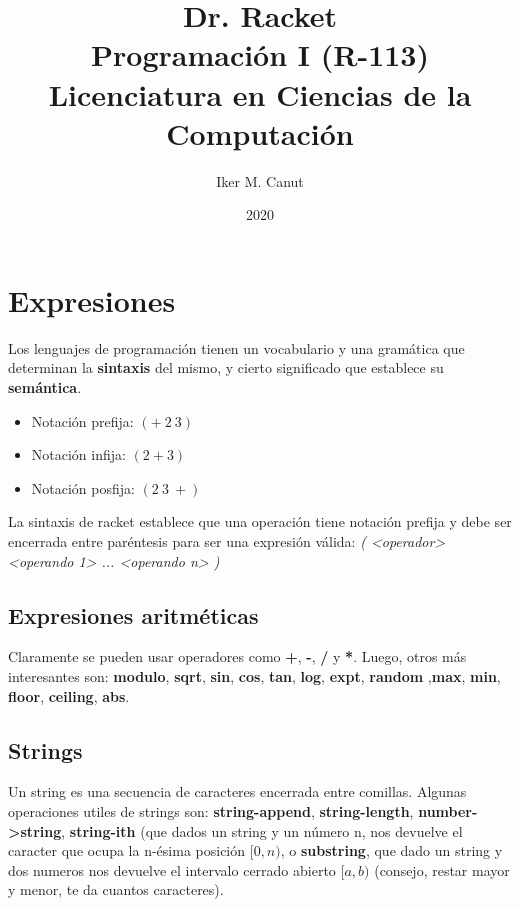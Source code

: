 \documentclass[11pt,a4paper]{article}
\begin{document}
\title{Dr. Racket\\Programaci\'on I (R-113)\\Licenciatura en Ciencias de la Computaci\'on}
\date{2020}

\author{Iker M. Canut}
\maketitle
\newpage

\section{Expresiones}
Los lenguajes de programación tienen un vocabulario y una gramática que determinan la \textbf{sintaxis} del mismo, y cierto significado que establece su \textbf{semántica}.
\begin{multicols}{3}
\begin{itemize}
\item Notación prefija: $(+\ 2\ 3)$
\item Notación infija:  $(2 + 3)$ 
\item Notación posfija: $(2\ 3\ +)$ 
\end{itemize}
\end{multicols}
La sintaxis de racket establece que una operación tiene notación prefija y debe ser encerrada entre paréntesis para ser una expresión válida: \textit{( <operador> <operando 1> ... <operando n> )}

\subsection{Expresiones aritméticas}
Claramente se pueden usar operadores como \textbf{+}, \textbf{-}, \textbf{/} y \textbf{*}. Luego, otros más interesantes son: \textbf{modulo}, \textbf{sqrt}, \textbf{sin}, \textbf{cos}, \textbf{tan}, \textbf{log}, \textbf{expt}, \textbf{random} ,\textbf{max}, \textbf{min}, \textbf{floor}, \textbf{ceiling}, \textbf{abs}.

\subsection{Strings}
Un string es una secuencia de caracteres encerrada entre comillas. Algunas operaciones utiles de strings son: \textbf{string-append}, \textbf{string-length}, \textbf{number->string}, \textbf{string-ith} (que dados un string y un n\'umero n, nos devuelve el caracter que ocupa la n-ésima posición $[0, n)$, o \textbf{substring}, que dado un string y dos numeros nos devuelve el intervalo cerrado abierto $[a,b)$ (consejo, restar mayor y menor, te da cuantos caracteres).
\end{document}
